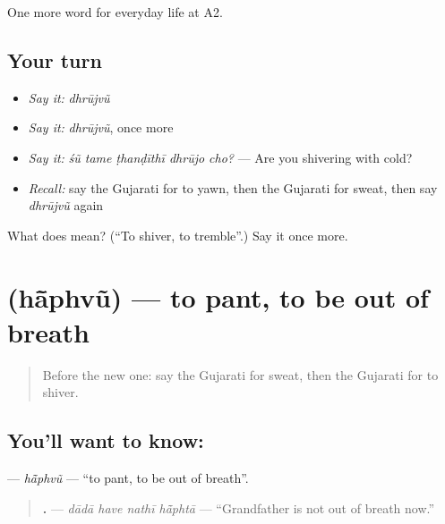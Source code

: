 \begin{grammarlens}[title={What you've built}]
One more word for everyday life at A2.
\end{grammarlens}

\subsection*{Your turn}
\begin{itemize}
\raggedright
  \item \emph{Say it:} \emph{dhrūjvũ}
  \item \emph{Say it:} \emph{dhrūjvũ}, once more
  \item \emph{Say it:} \emph{śũ tame ṭhanḍīthī dhrūjo cho?} — Are you shivering with cold?
  \item \emph{Recall:} say the Gujarati for to yawn, then the Gujarati for sweat, then say \emph{dhrūjvũ} again
\end{itemize}

\begin{tcolorbox}[breakable,colback=teal!4,colframe=teal!35!black,title={Before you move on}]
What does  mean? (\textquotedblleft{}To shiver, to tremble\textquotedblright{}.) Say it once more.
\end{tcolorbox}
\section[\texorpdfstring{\gu{હાંફવું} (hā̃phvũ)}{હાંફવું (hā̃phvũ)}]{ (hā̃phvũ) — to pant, to be out of breath}

\label{lesson:GU-C226-haphvu}



\begin{quote}
Before the new one: say the Gujarati for sweat, then the Gujarati for to shiver.
\end{quote}

\subsection*{You'll want to know: }
\textbf{} — \emph{hā̃phvũ} — \textquotedblleft{}to pant, to be out of breath\textquotedblright{}.

\begin{quote}
\textbf{   .} — \emph{dādā have nathī hā̃phtā} — \textquotedblleft{}Grandfather is not out of breath now.\textquotedblright{}
\end{quote}


